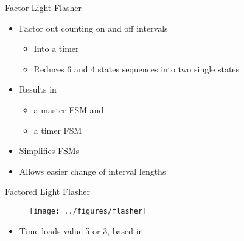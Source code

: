\begin{frame}[fragile]{Factor Light Flasher}
\begin{itemize}
\item Factor out counting on and off intervals
\begin{itemize}
\item Into a timer
\item Reduces 6 and 4 states sequences into two single states
\end{itemize}
\item Results in
\begin{itemize}
\item a master FSM and
\item a timer FSM
\end{itemize}
\item Simplifies FSMs
\item Allows easier change of interval lengths
\end{itemize}
\end{frame}



\begin{frame}[fragile]{Factored Light Flasher}
\begin{figure}
  \texttt{[image: ../figures/flasher]}
\end{figure}
\begin{itemize}
\item Time loads value 5 or 3, based in 
\end{itemize}
\end{frame}

